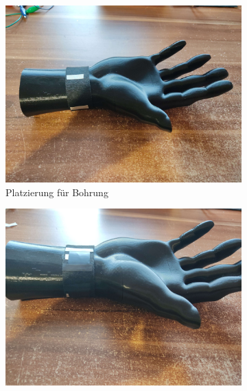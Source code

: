 \documentclass[12pt, a4paper]{article}
\begin{document}
\begin{figure}[h]
	\begin{subfigure}[c]{0.33\textwidth}
		\includegraphics[scale=.037]{assets/Strap_fitting_wires.jpg}
		\caption{Platzierung für Bohrung}
		\label{fig:Initial_drawing}
	\end{subfigure}
	\begin{subfigure}[c]{0.33\textwidth}
		\includegraphics[scale=.037]{assets/Strap_fitting_sensors.jpg}
		\label{fig:Initial_drawing}
	\end{subfigure}
		\begin{subfigure}[c]{0.33\textwidth}

\end{subfigure}
\end{figure}
\end{document}
